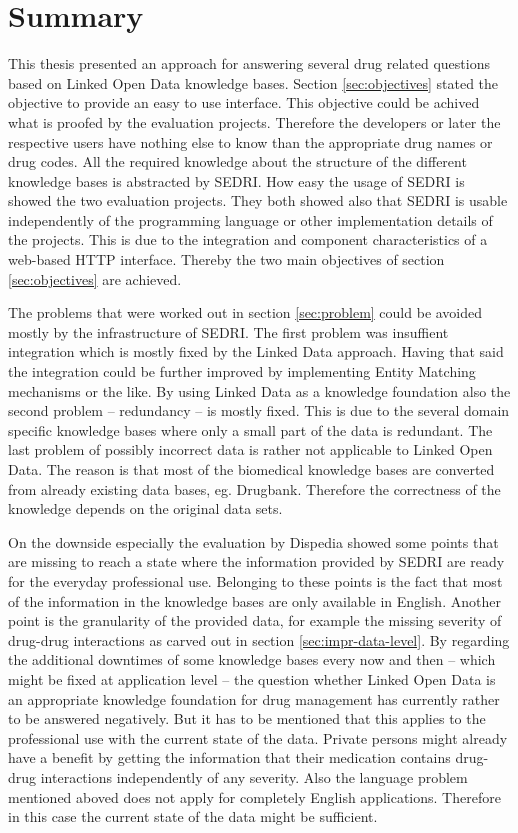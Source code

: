 \chapter{Summary}
\label{cha:summary}

This thesis presented an approach for answering several drug related questions based on Linked Open Data knowledge bases.
Section \ref{sec:objectives} stated the objective to provide an easy to use interface.
This objective could be achived what is proofed by the evaluation projects.
Therefore the developers or later the respective users have nothing else to know than the appropriate drug names or drug codes.
All the required knowledge about the structure of the different knowledge bases is abstracted by SEDRI.
How easy the usage of SEDRI is showed the two evaluation projects.
They both showed also that SEDRI is usable independently of the programming language or other implementation details of the projects.
This is due to the integration and component characteristics of a web-based HTTP interface.
Thereby the two main objectives of section \ref{sec:objectives} are achieved.

The problems that were worked out in section \ref{sec:problem} could be avoided mostly by the infrastructure of SEDRI.
The first problem was insuffient integration which is mostly fixed by the Linked Data approach.
Having that said the integration could be further improved by implementing Entity Matching mechanisms or the like.
By using Linked Data as a knowledge foundation also the second problem -- redundancy -- is mostly fixed.
This is due to the several domain specific knowledge bases where only a small part of the data is redundant.
The last problem of possibly incorrect data is rather not applicable to Linked Open Data.
The reason is that most of the biomedical knowledge bases are converted from already existing data bases, eg. Drugbank.
Therefore the correctness of the knowledge depends on the original data sets.

On the downside especially the evaluation by Dispedia showed some points that are missing to reach a state where the information provided by SEDRI are ready for the everyday professional use.
Belonging to these points is the fact that most of the information in the knowledge bases are only available in English.
Another point is the granularity of the provided data, for example the missing severity of drug-drug interactions as carved out in section \ref{sec:impr-data-level}.
By regarding the additional downtimes of some knowledge bases every now and then -- which might be fixed at application level -- the question whether Linked Open Data is an appropriate knowledge foundation for drug management has currently rather to be answered negatively. 
But it has to be mentioned that this applies to the professional use with the current state of the data.
Private persons might already have a benefit by getting the information that their medication contains drug-drug interactions independently of any severity.
Also the language problem mentioned aboved does not apply for completely English applications.
Therefore in this case the current state of the data might be sufficient.

